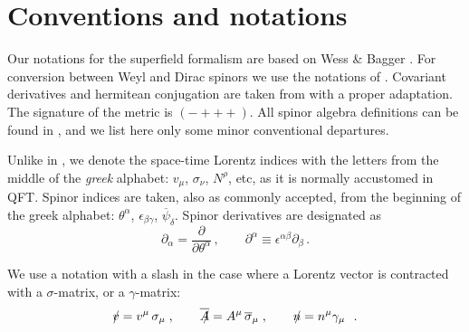 \documentclass[12pt]{revtex4}
\newcommand{\slashed}[1]{\hbox{{$#1$}\llap{$/$}}}
\begin{document}
\section{Conventions and notations}
\label{app_conventions}

Our notations for the superfield formalism are based on 
Wess \& Bagger 
\cite{Wess:1992cp}.
For conversion between Weyl and Dirac spinors we use the notations
of 
\cite{Martin:1997ns}.
Covariant derivatives and hermitean conjugation are taken from
\cite{Gates:1983nr}
with a proper adaptation. The signature of the metric is 
$ (-+++) $.
All spinor algebra definitions can be found in 
\cite{Wess:1992cp},
and we list here only some minor conventional departures.

Unlike in \cite{Wess:1992cp}, we denote the space-time Lorentz
indices with the letters from the middle of the \emph{greek}
alphabet:
$ v_\mu $, $ \sigma_\nu $, $ N^\rho $, etc,
as it is normally accustomed in QFT.
Spinor indices are taken, also as commonly accepted, from the
beginning of the greek alphabet:
$ \theta^\alpha $, $ \epsilon_{\beta\gamma} $, 
$ \overline{\psi}_{\dot\delta}$.
Spinor derivatives are designated as
\[
\partial_\alpha = \frac{\partial}{\partial\theta^\alpha}\,,
\qquad
\partial^\alpha \equiv \epsilon^{\alpha\beta}\partial_\beta
\,.
\]

We use a notation with a slash in the case where a Lorentz
vector is contracted with a $ \sigma $-matrix, or a $ \gamma $-matrix:
\begin{equation}
\label{def_slashed}
\slashed{v} = v^\mu\, \sigma_\mu\;, \qquad
\overline{\slashed{A}} = A^\mu\, \overline{\sigma}_\mu\;, \qquad
\slashed{n} = n^\mu \gamma_\mu~~.
\end{equation}
\end{document}
